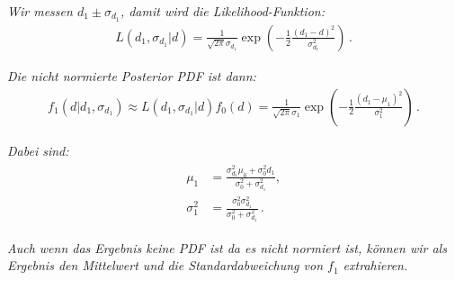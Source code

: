 \textit{Wir messen $d_1 \pm \sigma_{d_{1}}$, damit wird die Likelihood-Funktion:}
\begin{align}
L ( d_1, \sigma_{d_{1}} | d ) = \frac{ 1 }{ \sqrt{ 2 \pi} \sigma_{d_{1}} } \exp \left( - \frac{ 1 }{ 2 } \frac{ ( d_1 - d )^2 }{ \sigma_{d_{1}}^2 } \right)\,.
\label{eq:vl4-45}
\end{align}

\textit{Die nicht normierte Posterior PDF ist dann:}
\begin{align}
f_1 ( d | d_1, \sigma_{d_{1}}) \approx L ( d_1, \sigma_{d_{1}} | d ) f_0 ( d ) = \frac{ 1 }{ \sqrt{ 2 \pi} \sigma_1 } \exp \left( - \frac{ 1 }{ 2 } \frac{ ( d_1 - \mu_1 )^2 }{ \sigma_{1}^2 } \right)\,.
\label{eq:vl4-46}
\end{align}

\textit{Dabei sind:}
\begin{align}
\begin{split}
\mu_1 &= \frac{ \sigma_{d_{1}}^2 \mu_0 + \sigma_0^2 d_1 }{ \sigma_0^2 + \sigma_{d_{1}}^2 },\\
\sigma_1^2 &= \frac{ \sigma_0^2 \sigma_{d_{1}}^2 }{ \sigma_0^2 + \sigma_{d_{1}}^2 }\,.
\end{split}
\label{eq:vl4-47}
\end{align}

\textit{Auch wenn das Ergebnis keine PDF ist da es nicht normiert ist, k\"onnen wir als Ergebnis den Mittelwert und die Standardabweichung von $f_1$ extrahieren.}